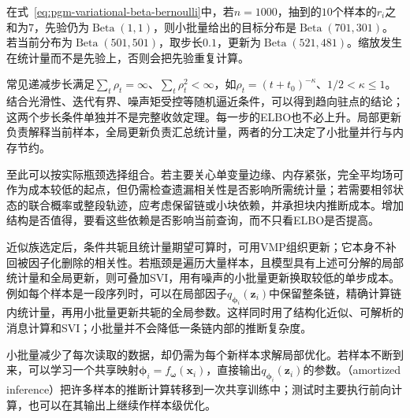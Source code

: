 在式~\eqref{eq:pgm-variational-beta-bernoulli}中，若$n=1000$，抽到的$10$个样本的$r_i$之和为$7$，先验仍为$\operatorname{Beta}(1,1)$，则小批量给出的目标分布是$\operatorname{Beta}(701,301)$。若当前分布为$\operatorname{Beta}(501,501)$，取步长$0.1$，更新为$\operatorname{Beta}(521,481)$。缩放发生在统计量而不是先验上，否则会把先验重复计算。

常见递减步长满足$\sum_t\rho_t=\infty$、$\sum_t\rho_t^2<\infty$，如$\rho_t=(t+t_0)^{-\kappa}$、$1/2<\kappa\leq1$。结合光滑性、迭代有界、噪声矩受控等随机逼近条件，可以得到趋向驻点的结论；这两个步长条件单独并不是完整收敛定理。每一步的ELBO也不必上升。局部更新负责解释当前样本，全局更新负责汇总统计量，两者的分工决定了小批量并行与内存节约。

至此可以按实际瓶颈选择组合。若主要关心单变量边缘、内存紧张，完全平均场可作为成本较低的起点，但仍需检查遗漏相关性是否影响所需统计量；若需要相邻状态的联合概率或整段轨迹，应考虑保留链或小块依赖，并承担块内推断成本。增加结构是否值得，要看这些依赖是否影响当前查询，而不只看ELBO是否提高。

近似族选定后，条件共轭且统计量期望可算时，可用VMP组织更新；它本身不补回被因子化删除的相关性。若瓶颈是遍历大量样本，且模型具有上述可分解的局部统计量和全局更新，则可叠加SVI，用有噪声的小批量更新换取较低的单步成本。例如每个样本是一段序列时，可以在局部因子$q_{\bm\phi_i}(\bm z_i)$中保留整条链，精确计算链内统计量，再用小批量更新共轭的全局参数。这样同时用了结构化近似、可解析的消息计算和SVI；小批量并不会降低一条链内部的推断复杂度。

\label{sec:pgm-variational-amortized}

小批量减少了每次读取的数据，却仍需为每个新样本求解局部优化。若样本不断到来，可以学习一个共享映射$\bm{\phi}_i=f_{\bm{\omega}}(\bm x_i)$，直接输出$q_{\bm{\phi}_i}(\bm z_i)$的参数。（amortized inference）把许多样本的推断计算转移到一次共享训练中；测试时主要执行前向计算，也可以在其输出上继续作样本级优化。

